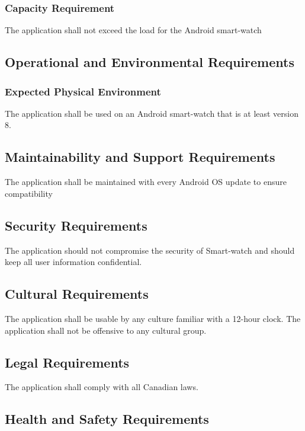 \documentclass[12pt, titlepage]{article}
\begin{document}
\subsubsection{Capacity Requirement}

The application shall not exceed the load for the Android smart-watch

\subsection{Operational and Environmental Requirements}

\subsubsection{Expected Physical Environment}

The application shall be used on an Android smart-watch that is at least version 8.

\subsection{Maintainability and Support Requirements}

The application shall be maintained with every Android OS update to ensure compatibility

\subsection{Security Requirements}

The application should not compromise the security of Smart-watch and should keep all user information confidential.

\subsection{Cultural Requirements}

The application shall be usable by any culture familiar with a 12-hour clock. The application shall not be offensive to any cultural group.

\subsection{Legal Requirements}

The application shall comply with all Canadian laws.

\subsection{Health and Safety Requirements}
\end{document}
